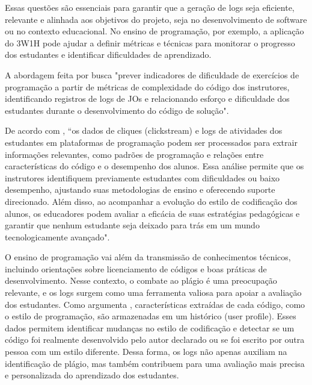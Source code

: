 Essas questões são essenciais para garantir que a geração de logs seja eficiente, relevante e alinhada aos objetivos do projeto, seja no desenvolvimento de software ou no contexto educacional. No ensino de programação, por exemplo, a aplicação do 3W1H pode ajudar a definir métricas e técnicas para monitorar o progresso dos estudantes e identificar dificuldades de aprendizado.

A abordagem feita por \cite{silva2022previsao} busca "prever indicadores de dificuldade de exercícios de programação a partir de métricas de complexidade do código dos instrutores, identificando registros de logs de JOs e relacionando esforço e dificuldade dos estudantes durante o desenvolvimento do código de solução".

De acordo com \cite{gupta2024identification}, ``os dados de cliques (clickstream) e logs de atividades dos estudantes em plataformas de programação podem ser processados para extrair informações relevantes, como padrões de programação e relações entre características do código e o desempenho dos alunos. Essa análise permite que os instrutores identifiquem previamente estudantes com dificuldades ou baixo desempenho, ajustando suas metodologias de ensino e oferecendo suporte direcionado. Além disso, ao acompanhar a evolução do estilo de codificação dos alunos, os educadores podem avaliar a eficácia de suas estratégias pedagógicas e garantir que nenhum estudante seja deixado para trás em um mundo tecnologicamente avançado".

O ensino de programação vai além da transmissão de conhecimentos técnicos, incluindo orientações sobre licenciamento de códigos e boas práticas de desenvolvimento. Nesse contexto, o combate ao plágio é uma preocupação relevante, e os logs surgem como uma ferramenta valiosa para apoiar a avaliação dos estudantes. Como argumenta \cite{arabyarmohamady2012coding}, características extraídas de cada código, como o estilo de programação, são armazenadas em um histórico (user profile). Esses dados permitem identificar mudanças no estilo de codificação e detectar se um código foi realmente desenvolvido pelo autor declarado ou se foi escrito por outra pessoa com um estilo diferente. Dessa forma, os logs não apenas auxiliam na identificação de plágio, mas também contribuem para uma avaliação mais precisa e personalizada do aprendizado dos estudantes.

